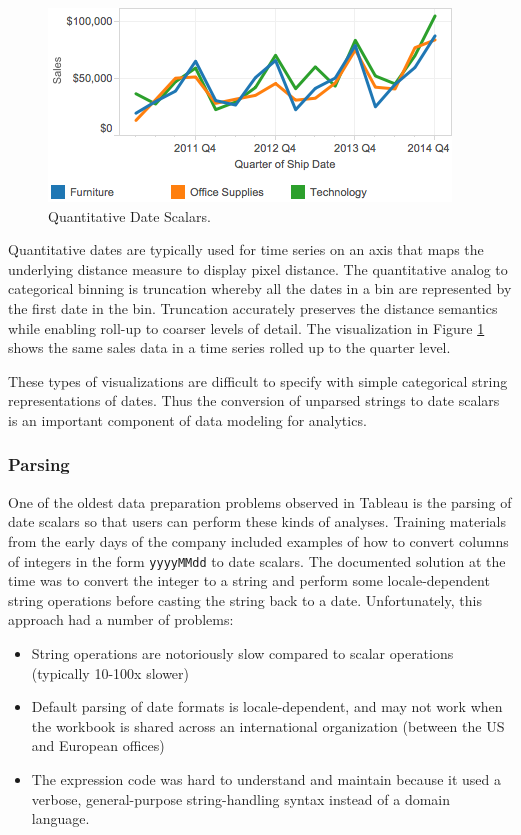 \begin{figure}[ht]
\centering
\includegraphics[width=\columnwidth]{figures/FigureI2}
\caption{Quantitative Date Scalars.}
\label{fig:I2}
\end{figure}



Quantitative dates are typically used for time series on an axis that maps the underlying distance measure to display pixel distance. The quantitative analog to categorical binning is truncation whereby all the dates in a bin are represented by the first date in the bin. Truncation accurately preserves the distance semantics while enabling roll-up to coarser levels of detail. The visualization in Figure \ref{fig:I2} shows the same sales data in a time series rolled up to the quarter level.

These types of visualizations are difficult to specify with simple categorical string representations of dates. Thus the conversion of unparsed strings to date scalars is an important component of data modeling for analytics.


\subsubsection{Parsing}
One of the oldest data preparation problems observed in Tableau is the parsing of date scalars so that users can perform these kinds of analyses. Training materials from the early days of the company included examples of how to convert columns of integers in the form \texttt{yyyyMMdd} to date scalars. The documented solution at the time was to convert the integer to a string and perform some locale-dependent string operations before casting the string back to a date. Unfortunately, this approach had a number of problems:
\begin{itemize}
\item String operations are notoriously slow compared to scalar operations (typically 10-100x slower)
\item Default parsing of date formats is locale-dependent, and may not work when the workbook is shared across an international organization (\eg between the US and European offices)
\item The expression code was hard to understand and maintain because it used a verbose, general-purpose string-handling syntax instead of a domain language.
\end{itemize}

